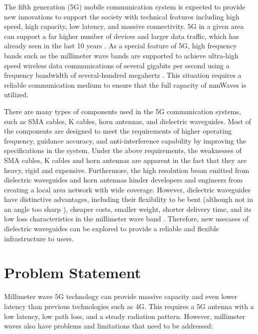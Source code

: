 \documentclass[a4paper,12pt]{report}
\begin{document}
The fifth generation (5G) mobile communication system
is expected to provide new innovations to support the society
with technical features including high speed, high
capacity, low latency, and massive connectivity.
5G in a given area can support a far higher number of devices
and larger data traffic,
which has already seen in the last 10 years \cite{pepper2013cisco}.
As a special feature of 5G,
high frequency bands such as the millimeter
wave bands are supported to achieve ultra-high speed
wireless data communications of several gigabits per second
using a frequency bandwidth of
several-hundred megahertz \cite{docomo_6G_white_paper}.
This situation requires a reliable communication medium to
ensure that the full capacity of mmWaves is utilized.

There are many types of components used in the 5G communication systems,
such as SMA cables, K cables, horn antennas, and dielectric waveguides.
Most of the components are designed to meet the
requirements of higher operating frequency, guidance accuracy, and anti-interference
capability by improving the specifications in the system.
Under the above requirements, the weaknesses of SMA cables, K cables and
horn antennas are apparent in the fact that they are heavy, rigid and expensive.
Furthermore, the high resolution beam emitted from dielectric waveguides
and horn antennas hinder developers and engineers from creating
a local area network with wide coverage.
However, dielectric waveguides have distinctive advantages,
including their flexibility to be bent (although not in an angle too sharp \cite{1017016}),
cheaper costs, smaller weight, shorter delivery time,
and its low loss characteristics in the millimeter wave band \cite{Suzuki2013MovingTU}.
Therefore,
new usecases of dielectric waveguides can be explored
to provide a reliable and flexible infrastructure to users.


\section{Problem Statement}

Millimeter wave 5G technology can provide massive capacity
and even lower latency than previous technologies such as 4G.
This requires a 5G antenna with a low latency,
low path loss, and a steady radiation pattern.
However, millimeter waves also have problems and limitations
that need to be addressed:
\end{document}
